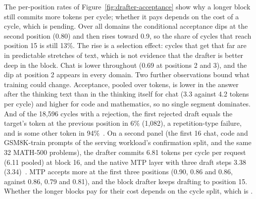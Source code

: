 The per-position rates of Figure~\ref{fig:drafter-acceptance} show why a longer block still commits more tokens per cycle; whether it pays depends on the cost of a cycle, which is pending. Over all domains the conditional acceptance dips at the second position (0.80) and then rises toward 0.9, so the share of cycles that reach position 15 is still 13\%. The rise is a selection effect: cycles that get that far are in predictable stretches of text, which is not evidence that the drafter is better deep in the block. Chat is lower throughout (0.69 at positions 2 and 3), and the dip at position 2 appears in every domain. Two further observations bound what training could change. Acceptance, pooled over tokens, is lower in the answer after the thinking text than in the thinking itself for chat (3.3 against 4.2 tokens per cycle) and higher for code and mathematics, so no single segment dominates. And of the 18,596 cycles with a rejection, the first rejected draft equals the target's token at the previous position in 6\% (1,082), a repetition-type failure, and is some other token in 94\%~. On a second panel (the first 16 chat, code and GSM8K-train prompts of the serving workload's confirmation split, and the same 32 MATH-500 problems), the drafter commits 6.81 tokens per cycle per request (6.11 pooled) at block 16, and the native MTP layer with three draft steps 3.38 (3.34)~. MTP accepts more at the first three positions (0.90, 0.86 and 0.86, against 0.86, 0.79 and 0.81), and the block drafter keeps drafting to position 15. Whether the longer blocks pay for their cost depends on the cycle split, which is .


